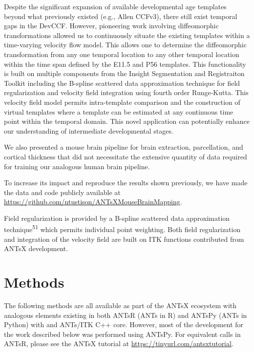 \documentclass[
  12pt,
]{article}
\begin{document}
Despite the significant expansion of available developmental age
templates beyond what previously existed (e.g., Allen CCFv3), there
still exist temporal gaps in the DevCCF. However, pioneering work
involving diffeomorphic transformations allowed us to continuously
situate the existing templates within a time-varying velocity flow
model. This allows one to determine the diffeomorphic transformation
from any one temporal location to any other temporal location within the
time span defined by the E11.5 and P56 templates. This functionality is
built on multiple components from the Insight Segmentation and
Registraiton Toolkit including the B-spline scattered data approximation
technique for field regularization and velocity field integration using
fourth order Runge-Kutta. This velocity field model permits
intra-template comparison and the construction of virtual templates
where a template can be estimated at any continuous time point within
the temporal domain. This novel application can potentially enhance our
understanding of intermediate developmental stages.

We also presented a mouse brain pipeline for brain extraction,
parcellation, and cortical thickness that did not necessitate the
extensive quantity of data required for training our analogous human
brain pipeline.

To increase its impact and reproduce the results shown previously, we
have made the data and code publicly available at
\url{https://github.com/ntustison/ANTsXMouseBrainMapping}.

\clearpage
\newpage

Field regularization is provided by a B-spline scattered data
approximation technique\textsuperscript{51} which permits individual
point weighting. Both field regularization and integration of the
velocity field are built on ITK functions contributed from ANTsX
development.

\hypertarget{methods}{%
\section*{Methods}\label{methods}}

The following methods are all available as part of the ANTsX ecosystem
with analogous elements existing in both ANTsR (ANTs in R) and ANTsPy
(ANTs in Python) with and ANTs/ITK C++ core. However, most of the
development for the work described below was performed using ANTsPy. For
equivalent calls in ANTsR, please see the ANTsX tutorial at
\url{https://tinyurl.com/antsxtutorial}.
\end{document}
